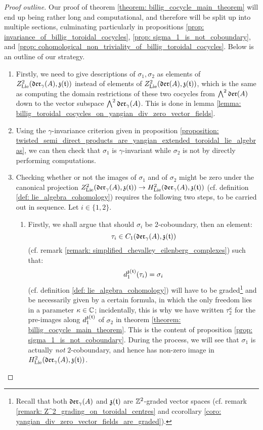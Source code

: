             \begin{proof}[Proof outline]
                Our proof of theorem \ref{theorem: billig_cocycle_main_theorem} will end up being rather long and computational, and therefore will be split up into multiple sections, culminating particularly in propositions \ref{prop: invariance_of_billig_toroidal_cocycles}, \ref{prop: sigma_1_is_not_coboundary}, and \ref{prop: cohomological_non_triviality_of_billig_toroidal_cocycles}. Below is an outline of our strategy.
                \begin{enumerate}
                    \item Firstly, we need to give descriptions of $\sigma_1, \sigma_2$ as elements of $Z^2_{\mathrm{Lie}}(\mathfrak{der}_{\gamma}(A), \mathfrak{z}(\mathfrak{t}))$ instead of elements of $Z^2_{\mathrm{Lie}}(\mathfrak{der}(A), \mathfrak{z}(\mathfrak{t}))$, which is the same as computing the domain restrictions of these two cocycles from $\bigwedge^2 \mathfrak{der}(A)$ down to the vector subspace $\bigwedge^2 \mathfrak{der}_{\gamma}(A)$. This is done in lemma \ref{lemma: billig_toroidal_cocycles_on_yangian_div_zero_vector_fields}.
                    \item Using the $\gamma$-invariance criterion given in proposition \ref{proposition: twisted_semi_direct_products_are_yangian_extended_toroidal_lie_algebras}, we can then check that $\sigma_1$ is $\gamma$-invariant while $\sigma_2$ is not by directly performing computations.
                    \item Checking whether or not the images of $\sigma_1$ and of $\sigma_2$ might be zero under the canonical projection $Z^2_{\mathrm{Lie}}(\mathfrak{der}_{\gamma}(A), \mathfrak{z}(\mathfrak{t})) \to H^2_{\mathrm{Lie}}(\mathfrak{der}_{\gamma}(A), \mathfrak{z}(\mathfrak{t}))$ (cf. definition \ref{def: lie_algebra_cohomology}) requires the following two steps, to be carried out in sequence. Let $i \in \{1, 2\}$.
                    \begin{enumerate}
                        \item Firstly, we shall argue that should $\sigma_i$ be $2$-coboundary, then an element:
                            $$\tau_i \in C_1(\mathfrak{der}_{\gamma}(A), \mathfrak{z}(\mathfrak{t}))$$
                        (cf. remark \ref{remark: simplified_chevalley_eilenberg_complexes}) such that:
                            $$d_1^{\mathfrak{z}(\mathfrak{t})}(\tau_i) = \sigma_i$$
                        (cf. definition \ref{def: lie_algebra_cohomology}) will have to be graded\footnote{Recall that both $\mathfrak{der}_{\gamma}(A)$ and $\mathfrak{z}(\mathfrak{t})$ are $\mathbb{Z}^2$-graded vector spaces (cf. remark \ref{remark: Z^2_grading_on_toroidal_centres} and ccorollary \ref{coro: yangian_div_zero_vector_fields_are_graded}).} and be necessarily given by a certain formula, in which the only freedom lies in a parameter $\kappa \in \mathbb{C}$; incidentally, this is why we have written $\tau_2^{\kappa}$ for the pre-images along $d_1^{\mathfrak{z}(\mathfrak{t})}$ of $\sigma_2$ in theorem \ref{theorem: billig_cocycle_main_theorem}. This is the content of proposition \ref{prop: sigma_1_is_not_coboundary}. During the process, we will see that $\sigma_1$ is actually \textit{not} $2$-coboundary, and hence has non-zero image in $H^2_{\mathrm{Lie}}(\mathfrak{der}_{\gamma}(A), \mathfrak{z}(\mathfrak{t}))$.

\end{enumerate}
\end{enumerate}
\end{proof}
